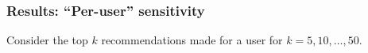 \documentclass[handout]{beamer}
\begin{document}
\begin{frame}
\frametitle{Results: ``Per-user'' sensitivity}
Consider the top $k$ recommendations made for a user for $k = 5, 10, \dots, 50$.
\begin{figure}[h]
  \begin{center}
  \end{center}
\end{figure}
\end{frame}
\end{document}
